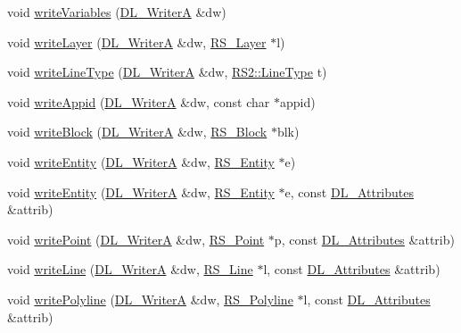 \begin{DoxyCompactItemize}
\item 
void \hyperlink{classRS__FilterDXF_ac44af4b7ba5b7caaa231e0acf2bc25c7}{write\-Variables} (\hyperlink{classDL__WriterA}{D\-L\-\_\-\-Writer\-A} \&dw)
\item 
void \hyperlink{classRS__FilterDXF_a372bc14125237315791f2cee18d8ac22}{write\-Layer} (\hyperlink{classDL__WriterA}{D\-L\-\_\-\-Writer\-A} \&dw, \hyperlink{classRS__Layer}{R\-S\-\_\-\-Layer} $\ast$l)
\item 
void \hyperlink{classRS__FilterDXF_ab801150163193b0868ae9c9ec78f63a6}{write\-Line\-Type} (\hyperlink{classDL__WriterA}{D\-L\-\_\-\-Writer\-A} \&dw, \hyperlink{classRS2_a6f3a82972c2d62456f6cacb74e14c95f}{R\-S2\-::\-Line\-Type} t)
\item 
void \hyperlink{classRS__FilterDXF_a6f22dbdf3f22dfd0f40566f61f7ac283}{write\-Appid} (\hyperlink{classDL__WriterA}{D\-L\-\_\-\-Writer\-A} \&dw, const char $\ast$appid)
\item 
void \hyperlink{classRS__FilterDXF_a0475ec1f9b6abc613da33b7d2bbac059}{write\-Block} (\hyperlink{classDL__WriterA}{D\-L\-\_\-\-Writer\-A} \&dw, \hyperlink{classRS__Block}{R\-S\-\_\-\-Block} $\ast$blk)
\item 
void \hyperlink{classRS__FilterDXF_a2ee821d5428cafd5abe57b8e0de3540d}{write\-Entity} (\hyperlink{classDL__WriterA}{D\-L\-\_\-\-Writer\-A} \&dw, \hyperlink{classRS__Entity}{R\-S\-\_\-\-Entity} $\ast$e)
\item 
void \hyperlink{classRS__FilterDXF_a03df1dd8a2fcc0f96e98116a714d40f2}{write\-Entity} (\hyperlink{classDL__WriterA}{D\-L\-\_\-\-Writer\-A} \&dw, \hyperlink{classRS__Entity}{R\-S\-\_\-\-Entity} $\ast$e, const \hyperlink{classDL__Attributes}{D\-L\-\_\-\-Attributes} \&attrib)
\item 
void \hyperlink{classRS__FilterDXF_a3eec6502518f39184b9b2f390d999e02}{write\-Point} (\hyperlink{classDL__WriterA}{D\-L\-\_\-\-Writer\-A} \&dw, \hyperlink{classRS__Point}{R\-S\-\_\-\-Point} $\ast$p, const \hyperlink{classDL__Attributes}{D\-L\-\_\-\-Attributes} \&attrib)
\item 
void \hyperlink{classRS__FilterDXF_a433971ffa409fd54eb92261f0739840d}{write\-Line} (\hyperlink{classDL__WriterA}{D\-L\-\_\-\-Writer\-A} \&dw, \hyperlink{classRS__Line}{R\-S\-\_\-\-Line} $\ast$l, const \hyperlink{classDL__Attributes}{D\-L\-\_\-\-Attributes} \&attrib)
\item 
void \hyperlink{classRS__FilterDXF_a398f55aec6237940cb79e2c54c5d0edf}{write\-Polyline} (\hyperlink{classDL__WriterA}{D\-L\-\_\-\-Writer\-A} \&dw, \hyperlink{classRS__Polyline}{R\-S\-\_\-\-Polyline} $\ast$l, const \hyperlink{classDL__Attributes}{D\-L\-\_\-\-Attributes} \&attrib)

\end{DoxyCompactItemize}
